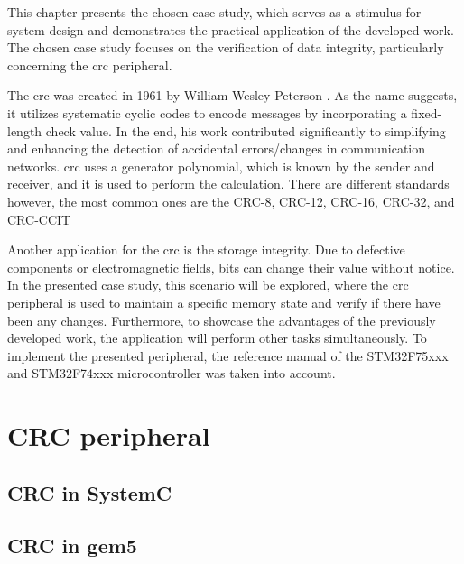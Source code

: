This chapter presents the chosen case study, which serves as a stimulus for system design and demonstrates 
the practical application of the developed work. The chosen case study focuses on the verification of 
data integrity, particularly concerning the \gls{crc} peripheral.

The \gls{crc} was created in 1961 by William Wesley Peterson \cite{peterson1961cyclic}. As the name suggests, 
it utilizes systematic cyclic codes to encode messages by incorporating a fixed-length check value. In the end, his work
contributed significantly to simplifying and enhancing the detection of accidental errors/changes in communication 
networks. \gls{crc} uses a generator polynomial, which is known by the sender and receiver, and it is used to 
perform the calculation. There are different standards however, the most common ones are the CRC-8, CRC-12, CRC-16, 
CRC-32, and CRC-CCIT \cite{borrelli2001ieee}

Another application for the \gls{crc} is the storage integrity. Due to defective components or electromagnetic fields,
bits can change their value without notice. In the presented case study, this scenario will be explored, where 
the \gls{crc} peripheral is used to maintain a specific memory state and verify if there have been any changes. 
Furthermore, to showcase the advantages of the previously developed work, the application will perform other 
tasks simultaneously. To implement the presented peripheral, the reference manual of the STM32F75xxx and 
STM32F74xxx microcontroller was taken into account.


\section{CRC peripheral} %

\subsection{CRC in SystemC}


\subsection{CRC in gem5}


